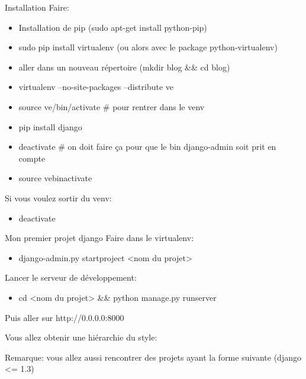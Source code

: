 \documentclass{beamer}
\begin{document}
\begin{frame}{Installation}
    Faire:
    \begin{itemize}
        \item Installation de pip (sudo apt-get install python-pip)\pause
        \item sudo pip install virtualenv (ou alors avec le package python-virtualenv)\pause
        \item aller dans un nouveau répertoire (mkdir blog \&\& cd blog)\pause
        \item virtualenv --no-site-packages --distribute ve\pause
        \item source ve/bin/activate \# pour rentrer dans le venv\pause
        \item pip install django\pause
        \item deactivate \# on doit faire ça pour que le bin django-admin soit prit en compte
        \item source ve\/bin\/activate
    \end{itemize}
    \vspace{3mm}
    \pause
    Si vous voulez sortir du venv:
    \begin{itemize}
        \item deactivate
    \end{itemize}
\end{frame}

\begin{frame}{Mon premier projet django}
    Faire dans le virtualenv:
    \begin{itemize}
        \item django-admin.py startproject <nom du projet>
    \end{itemize}
    \pause
    Lancer le serveur de développement:
    \begin{itemize}
        \item cd <nom du projet> \&\& python manage.py runserver
    \end{itemize}
    Puis aller sur http://0.0.0.0:8000
\end{frame}

\begin{frame}
    Vous allez obtenir une hiérarchie du style:
\end{frame}

\begin{frame}
    Remarque: vous allez aussi rencontrer des projets ayant la forme suivante (django <= 1.3)
\end{frame}
\end{document}

